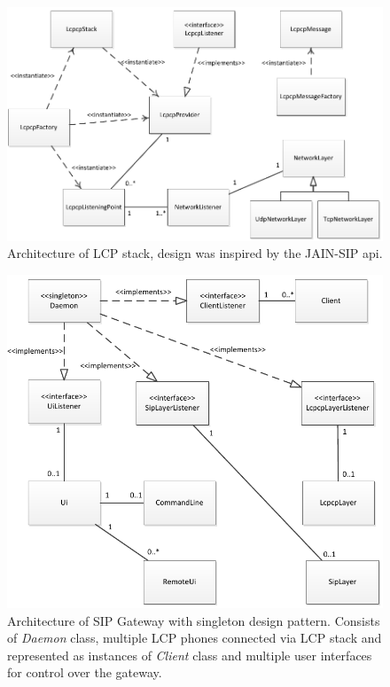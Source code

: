 \begin{figure}[H]
\centering
\includegraphics[width=14cm]{fig/lcpstack.pdf}
\caption{Architecture of LCP stack, design was inspired by the JAIN-SIP 
api\cite{jainsip}.}
\label{lcpstack}
\end{figure}

\begin{figure}[H]
\centering
\includegraphics[width=14cm]{fig/sipgw.pdf}
\caption{Architecture of SIP Gateway with singleton design pattern. Consists
of \textit{Daemon} class, multiple LCP phones connected via LCP stack and 
represented as instances of \textit{Client} class and multiple user interfaces
for control over the gateway.}
\label{gw}
\end{figure}

